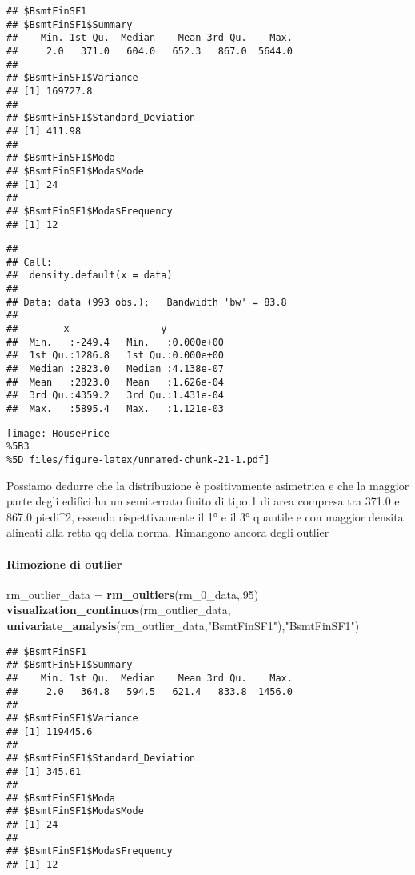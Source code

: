 \documentclass[
]{article}
\newenvironment{Shaded}{\begin{snugshade}}{\end{snugshade}}
\newcommand{\DecValTok}[1]{\textcolor[rgb]{0.00,0.00,0.81}{#1}}
\newcommand{\FunctionTok}[1]{\textcolor[rgb]{0.13,0.29,0.53}{\textbf{#1}}}
\newcommand{\NormalTok}[1]{#1}
\newcommand{\OtherTok}[1]{\textcolor[rgb]{0.56,0.35,0.01}{#1}}
\newcommand{\StringTok}[1]{\textcolor[rgb]{0.31,0.60,0.02}{#1}}
\begin{document}
\begin{verbatim}
## $BsmtFinSF1
## $BsmtFinSF1$Summary
##    Min. 1st Qu.  Median    Mean 3rd Qu.    Max. 
##     2.0   371.0   604.0   652.3   867.0  5644.0 
## 
## $BsmtFinSF1$Variance
## [1] 169727.8
## 
## $BsmtFinSF1$Standard_Deviation
## [1] 411.98
## 
## $BsmtFinSF1$Moda
## $BsmtFinSF1$Moda$Mode
## [1] 24
## 
## $BsmtFinSF1$Moda$Frequency
## [1] 12
\end{verbatim}

\begin{verbatim}
## 
## Call:
##  density.default(x = data)
## 
## Data: data (993 obs.);   Bandwidth 'bw' = 83.8
## 
##        x                y            
##  Min.   :-249.4   Min.   :0.000e+00  
##  1st Qu.:1286.8   1st Qu.:0.000e+00  
##  Median :2823.0   Median :4.138e-07  
##  Mean   :2823.0   Mean   :1.626e-04  
##  3rd Qu.:4359.2   3rd Qu.:1.431e-04  
##  Max.   :5895.4   Max.   :1.121e-03
\end{verbatim}

\texttt{[image: HousePrice\\\%5B3\\\%5D\_files/figure-latex/unnamed-chunk-21-1.pdf]}

Possiamo dedurre che la distribuzione è positivamente asimetrica e che
la maggior parte degli edifici ha un semiterrato finito di tipo 1 di
area compresa tra 371.0 e 867.0 piedi\^{}2, essendo rispettivamente il
1° e il 3° quantile e con maggior densita alineati alla retta qq della
norma. Rimangono ancora degli outlier

\paragraph{Rimozione di outlier}\label{rimozione-di-outlier-2}

\begin{Shaded}
\begin{Highlighting}[]
\NormalTok{rm\_outlier\_data }\OtherTok{=} \FunctionTok{rm\_oultiers}\NormalTok{(rm\_0\_data,.}\DecValTok{95}\NormalTok{)}
\FunctionTok{visualization\_continuos}\NormalTok{(rm\_outlier\_data, }\FunctionTok{univariate\_analysis}\NormalTok{(rm\_outlier\_data,}\StringTok{"BsmtFinSF1"}\NormalTok{),}\StringTok{"BsmtFinSF1"}\NormalTok{)}
\end{Highlighting}
\end{Shaded}

\begin{verbatim}
## $BsmtFinSF1
## $BsmtFinSF1$Summary
##    Min. 1st Qu.  Median    Mean 3rd Qu.    Max. 
##     2.0   364.8   594.5   621.4   833.8  1456.0 
## 
## $BsmtFinSF1$Variance
## [1] 119445.6
## 
## $BsmtFinSF1$Standard_Deviation
## [1] 345.61
## 
## $BsmtFinSF1$Moda
## $BsmtFinSF1$Moda$Mode
## [1] 24
## 
## $BsmtFinSF1$Moda$Frequency
## [1] 12
\end{verbatim}
\end{document}

